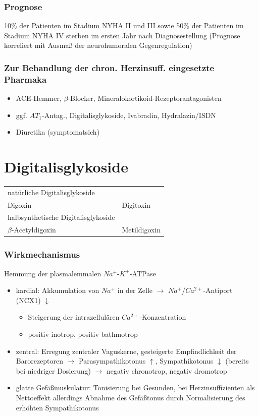 \documentclass[10pt,a4paper]{report}
\begin{document}
\subsubsection{Prognose}10\% der Patienten im Stadium NYHA II und III sowie 50\% der Patienten im Stadium NYHA IV sterben im ersten Jahr nach Diagnosestellung (Prognose korreliert mit  Ausmaß der neurohumoralen Gegenregulation)
\subsubsection{Zur Behandlung der chron. Herzinsuff. eingesetzte Pharmaka}
\begin{itemize}
	\item ACE-Hemmer, $\beta$-Blocker,  Mineralokortikoid-Rezeptorantagonisten 
	\item ggf. $AT_1$-Antag., Digitalisglykoside, Ivabradin, Hydralazin/ISDN 
	\item Diuretika (symptomatsich)
\end{itemize}
\section{Digitalisglykoside}
\begin{tabularx}{\textwidth}{XX}
natürliche Digitalisglykoside&\\
Digoxin&Digitoxin\\
halbsynthetische Digitalisglykoside&\\
$\beta$-Acetyldigoxin&Metildigoxin\\
\end{tabularx}
\subsubsection{Wirkmechanismus}
Hemmung der plasmalemmalen $Na^+$-$K^+$-ATPase 
\begin{itemize}
	\item kardial: Akkumulation von $Na^+$ in der Zelle $\rightarrow$ $Na^+$/$Ca^{2+}$-Antiport (NCX1) $\downarrow$
	\begin{itemize}
		\item Steigerung der intrazellulären $Ca^{2+}$-Konzentration 
		\item positiv inotrop, positiv bathmotrop
	\end{itemize}
	\item zentral: Erregung zentraler Vaguskerne, gesteigerte Empfindlichkeit der Barorezeptoren $\rightarrow$ Parasympathikotonus $\uparrow$, Sympathikotonus $\downarrow$ (bereits bei niedriger Dosierung)	$\rightarrow$ negativ chronotrop, negativ dromotrop
	\item glatte Gefäßmuskulatur: Tonisierung bei Gesunden, bei Herzinsuffizienten als Nettoeffekt allerdings Abnahme des Gefäßtonus durch Normalisierung des erhöhten Sympathikotonus
\end{itemize}
\end{document}
